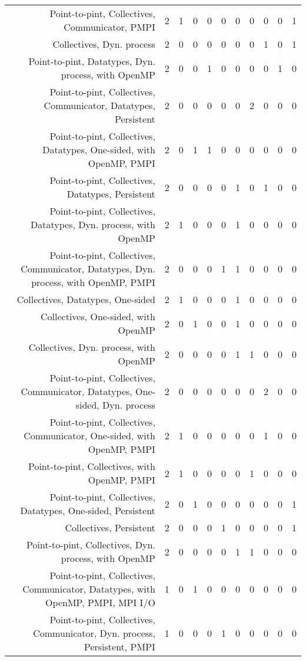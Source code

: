 {\begin{landscape}
\begin{longtable}[htb]{r|c|c|c|c|c|c|c|c|c|c}
{Point-to-pint, Collectives, Communicator, PMPI} & 2 & 1 & 0 & 0 & 0 & 0 & 0 & 0 & 0 & 1 \\%
{Collectives, Dyn. process} & 2 & 0 & 0 & 0 & 0 & 0 & 0 & 1 & 0 & 1 \\%
{Point-to-pint, Datatypes, Dyn. process, with OpenMP} & 2 & 0 & 0 & 1 & 0 & 0 & 0 & 0 & 1 & 0 \\%
{Point-to-pint, Collectives, Communicator, Datatypes, Persistent} & 2 & 0 & 0 & 0 & 0 & 0 & 2 & 0 & 0 & 0 \\%
{Point-to-pint, Collectives, Datatypes, One-sided, with OpenMP, PMPI} & 2 & 0 & 1 & 1 & 0 & 0 & 0 & 0 & 0 & 0 \\%
{Point-to-pint, Collectives, Datatypes, Persistent} & 2 & 0 & 0 & 0 & 0 & 1 & 0 & 1 & 0 & 0 \\%
{Point-to-pint, Collectives, Datatypes, Dyn. process, with OpenMP} & 2 & 1 & 0 & 0 & 0 & 1 & 0 & 0 & 0 & 0 \\%
{Point-to-pint, Collectives, Communicator, Datatypes, Dyn. process, with OpenMP, PMPI} & 2 & 0 & 0 & 0 & 1 & 1 & 0 & 0 & 0 & 0 \\%
{Collectives, Datatypes, One-sided} & 2 & 1 & 0 & 0 & 0 & 1 & 0 & 0 & 0 & 0 \\%
{Collectives, One-sided, with OpenMP} & 2 & 0 & 1 & 0 & 0 & 1 & 0 & 0 & 0 & 0 \\%
{Collectives, Dyn. process, with OpenMP} & 2 & 0 & 0 & 0 & 0 & 1 & 1 & 0 & 0 & 0 \\%
{Point-to-pint, Collectives, Communicator, Datatypes, One-sided, Dyn. process} & 2 & 0 & 0 & 0 & 0 & 0 & 0 & 2 & 0 & 0 \\%
{Point-to-pint, Collectives, Communicator, One-sided, with OpenMP, PMPI} & 2 & 1 & 0 & 0 & 0 & 0 & 0 & 1 & 0 & 0 \\%
{Point-to-pint, Collectives, with OpenMP, PMPI} & 2 & 1 & 0 & 0 & 0 & 0 & 1 & 0 & 0 & 0 \\%
{Point-to-pint, Collectives, Datatypes, One-sided, Persistent} & 2 & 0 & 1 & 0 & 0 & 0 & 0 & 0 & 0 & 1 \\%
{Collectives, Persistent} & 2 & 0 & 0 & 0 & 1 & 0 & 0 & 0 & 0 & 1 \\%
{Point-to-pint, Collectives, Dyn. process, with OpenMP} & 2 & 0 & 0 & 0 & 0 & 1 & 1 & 0 & 0 & 0 \\%
{Point-to-pint, Collectives, Communicator, Datatypes, with OpenMP, PMPI, MPI I/O} & 1 & 0 & 1 & 0 & 0 & 0 & 0 & 0 & 0 & 0 \\%
{Point-to-pint, Collectives, Communicator, Dyn. process, Persistent, PMPI} & 1 & 0 & 0 & 0 & 1 & 0 & 0 & 0 & 0 & 0 \\%

\end{longtable}
\end{landscape}}
